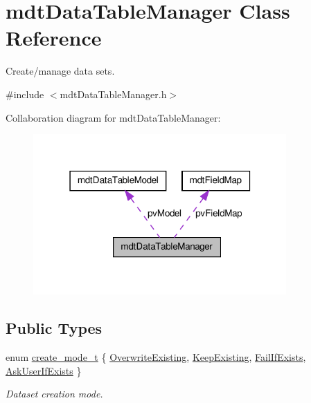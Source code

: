 \hypertarget{classmdt_data_table_manager}{
\section{mdtDataTableManager Class Reference}
\label{classmdt_data_table_manager}
}


Create/manage data sets.  




{\ttfamily \#include $<$mdtDataTableManager.h$>$}



Collaboration diagram for mdtDataTableManager:
\nopagebreak
\begin{figure}[H]
\begin{center}
\leavevmode
\includegraphics[width=274pt]{classmdt_data_table_manager__coll__graph}
\end{center}
\end{figure}
\subsection*{Public Types}
\begin{DoxyCompactItemize}
\item 
enum \hyperlink{classmdt_data_table_manager_a2bccf081737f3237ecdbe346dba559a8}{create\_\-mode\_\-t} \{ \hyperlink{classmdt_data_table_manager_a2bccf081737f3237ecdbe346dba559a8aa6a9a7bbd0b4003b3fb560b40b80912d}{OverwriteExisting}, 
\hyperlink{classmdt_data_table_manager_a2bccf081737f3237ecdbe346dba559a8acfd291caff4d096492815d1709b7a3fe}{KeepExisting}, 
\hyperlink{classmdt_data_table_manager_a2bccf081737f3237ecdbe346dba559a8a8d950620af815a15cfefe6843a848f78}{FailIfExists}, 
\hyperlink{classmdt_data_table_manager_a2bccf081737f3237ecdbe346dba559a8a6f1c53b5c2a4fb195fb6c8fa1a536e8c}{AskUserIfExists}
 \}
\begin{DoxyCompactList}\small\item\em Dataset creation mode. \end{DoxyCompactList}\end{DoxyCompactItemize}
